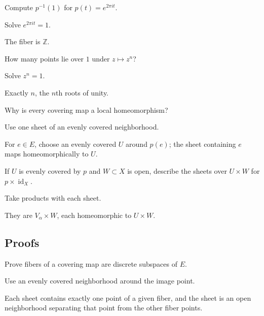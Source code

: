 \begin{exercise}\label{exr:viii10-ped-02}
Compute $p^{-1}(1)$ for $p(t)=e^{2\pi it}$.
\end{exercise}
\begin{hint}
Solve $e^{2\pi it}=1$.
\end{hint}
\begin{solution}
The fiber is $\mathbb Z$.
\end{solution}

\begin{exercise}\label{exr:viii10-ped-03}
How many points lie over $1$ under $z\mapsto z^n$?
\end{exercise}
\begin{hint}
Solve $z^n=1$.
\end{hint}
\begin{solution}
Exactly $n$, the $n$th roots of unity.
\end{solution}

\begin{exercise}\label{exr:viii10-ped-04}
Why is every covering map a local homeomorphism?
\end{exercise}
\begin{hint}
Use one sheet of an evenly covered neighborhood.
\end{hint}
\begin{solution}
For $e\in E$, choose an evenly covered $U$ around $p(e)$; the sheet containing $e$ maps homeomorphically to $U$.
\end{solution}

\begin{exercise}\label{exr:viii10-ped-05}
If $U$ is evenly covered by $p$ and $W\subset X$ is open, describe the sheets over $U\times W$ for $p\times\operatorname{id}_X$.
\end{exercise}
\begin{hint}
Take products with each sheet.
\end{hint}
\begin{solution}
They are $V_\alpha\times W$, each homeomorphic to $U\times W$.
\end{solution}

\subsection*{Proofs}

\begin{exercise}\label{exr:viii10-ped-06}
Prove fibers of a covering map are discrete subspaces of $E$.
\end{exercise}
\begin{hint}
Use an evenly covered neighborhood around the image point.
\end{hint}
\begin{solution}
Each sheet contains exactly one point of a given fiber, and the sheet is an open neighborhood separating that point from the other fiber points.
\end{solution}

